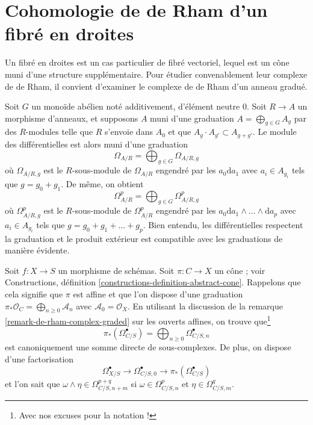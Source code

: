 \section{Cohomologie de de Rham d'un fibré en droites}
\label{section-line-bundle}

\noindent
Un fibré en droites est un cas particulier de fibré vectoriel, lequel est
un cône muni d'une structure supplémentaire. Pour étudier convenablement
leur complexe de de Rham, il convient d'examiner le complexe de de Rham
d'un anneau gradué.

\begin{remark}
\label{remark-de-rham-complex-graded}
Soit $G$ un monoïde abélien noté additivement, d'élément neutre $0$.
Soit $R \to A$ un morphisme d'anneaux, et supposons $A$ muni d'une graduation
$A = \bigoplus_{g \in G} A_g$ par des $R$-modules telle que $R$ s'envoie dans $A_0$
et que $A_g \cdot A_{g'} \subset A_{g + g'}$. Le module des différentielles
est alors muni d'une graduation
$$
\Omega_{A/R} = \bigoplus\nolimits_{g \in G} \Omega_{A/R, g}
$$
où $\Omega_{A/R, g}$ est le $R$-sous-module de $\Omega_{A/R}$
engendré par les $a_0 \text{d}a_1$ avec $a_i \in A_{g_i}$ tels que
$g = g_0 + g_1$. De même, on obtient
$$
\Omega^p_{A/R} = \bigoplus\nolimits_{g \in G} \Omega^p_{A/R, g}
$$
où $\Omega^p_{A/R, g}$ est le $R$-sous-module de $\Omega^p_{A/R}$
engendré par les $a_0 \text{d}a_1 \wedge \ldots \wedge \text{d}a_p$
avec $a_i \in A_{g_i}$ tels que $g = g_0 + g_1 + \ldots + g_p$.
Bien entendu, les différentielles respectent la graduation et le produit
extérieur est compatible avec les graduations de manière évidente.
\end{remark}

\noindent
Soit $f : X \to S$ un morphisme de schémas. Soit $\pi : C \to X$ un cône ; voir
Constructions, définition \ref{constructions-definition-abstract-cone}.
Rappelons que cela signifie que $\pi$ est affine et que l'on dispose d'une graduation
$\pi_*\mathcal{O}_C = \bigoplus_{n \geq 0} \mathcal{A}_n$ avec
$\mathcal{A}_0 = \mathcal{O}_X$.
En utilisant la discussion de la remarque \ref{remark-de-rham-complex-graded}
sur les ouverts affines, on trouve que\footnote{Avec nos excuses pour la notation !}
$$
\pi_*(\Omega^\bullet_{C/S}) =
\bigoplus\nolimits_{n \geq 0} \Omega^\bullet_{C/S, n}
$$
est canoniquement une somme directe de sous-complexes. De plus, on dispose d'une factorisation
$$
\Omega^\bullet_{X/S} \to \Omega^\bullet_{C/S, 0} \to
\pi_*(\Omega^\bullet_{C/S})
$$
et l'on sait que $\omega \wedge \eta \in \Omega^{p + q}_{C/S, n + m}$
si $\omega \in \Omega^p_{C/S, n}$ et $\eta \in \Omega^q_{C/S, m}$.

